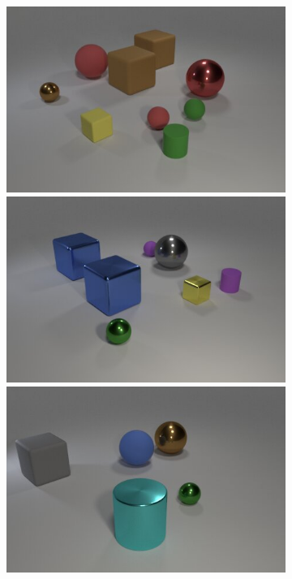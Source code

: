 \begin{figure}
\begin{subfigure}{.3225\linewidth}
\includegraphics[width=\linewidth]{figures/clevr/ns-vqa/5.jpg}\\
\includegraphics[width=\linewidth]{figures/clevr/ns-vqa/6.jpg}\\
\includegraphics[width=\linewidth]{figures/clevr/ns-vqa/7.jpg}

\end{subfigure}
\end{figure}
